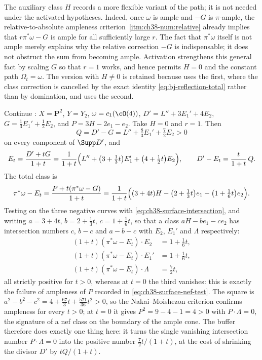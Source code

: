 \begin{remark}
\label{rem:ch38-buffer-H}
The auxiliary class $H$ records a more flexible variant of the path; it
is not needed under the activated hypotheses.  Indeed, once $\omega$ is
ample and $-G$ is $\pi$-ample, the relative-to-absolute ampleness
criterion
\,\cref{itm:ch38-num:relative} already
implies that $r\pi^*\omega-G$ is ample for all sufficiently large
$r$.  The fact that $\pi^*\omega$ itself is not ample merely explains
why the relative correction $-G$ is indispensable; it does not obstruct
the sum from becoming ample.  Activation strengthens this general fact by
scaling $G$ so that $r=1$ works, and hence permits $H=0$ and the
constant path $\Omega_t=\omega$.  The version with $H\neq0$ is retained
because
 uses the first, where the class correction is
cancelled by the exact identity \eqref{eq:bj-reflection-total} rather than
by domination, and  uses the second.
\end{remark}

\begin{example}
\label{ex:ch38-buffer-surface}
Continue : $X=\mathbf P^2$,
$Y=Y_2$, $\omega=c_1(\cO(4))$,
$D'=L''+3E_1'+4E_2$, $G=\tfrac13E_1'+\tfrac12E_2$, and
$P=3H-2e_1-e_2$.  Take $H=0$ and $r=1$.  Then
\[
 Q=D'-G=L''+\tfrac83E_1'+\tfrac72E_2>0
\]
on every component of $\Supp D'$, and
\[
 E_t=\frac{D'+tG}{1+t}
 =\frac{1}{1+t}\Bigl(L''+\bigl(3+\tfrac13t\bigr)E_1'
 +\bigl(4+\tfrac12t\bigr)E_2\Bigr),
 \qquad
 D'-E_t=\frac{t}{1+t}\,Q .
\]
The total class is
\[
 \pi^*\omega-E_t=\frac{P+t(\pi^*\omega-G)}{1+t}
 =\frac{1}{1+t}\Bigl(
   (3+4t)H-\bigl(2+\tfrac13t\bigr)e_1-\bigl(1+\tfrac16t\bigr)e_2\Bigr).
\]
Testing on the three negative curves with
\eqref{eq:ch38-surface-intersection}, and writing
$a=3+4t$, $b=2+\tfrac13t$, $c=1+\tfrac16t$, so that a class
$aH-be_1-ce_2$ has intersection numbers $c$, $b-c$ and $a-b-c$
with $E_2$, $E_1'$ and $\Lambda$ respectively:
\[
 \begin{aligned}
  (1+t)(\pi^*\omega-E_t)\cdot E_2&=1+\tfrac16t,\\
  (1+t)(\pi^*\omega-E_t)\cdot E_1'&=1+\tfrac16t,\\
  (1+t)(\pi^*\omega-E_t)\cdot\Lambda&=\tfrac72t,
 \end{aligned}
\]
all strictly positive for $t>0$, whereas at $t=0$ the third vanishes:
this is exactly the failure of ampleness of $P$ recorded in
\eqref{eq:ch38-surface-nef-test}.  The square is
$a^2-b^2-c^2=4+\tfrac{67}3t+\tfrac{571}{36}t^2>0$, so the
Nakai--Moishezon criterion confirms ampleness for every $t>0$; at
$t=0$ it gives $P^2=9-4-1=4>0$ with $P\cdot\Lambda=0$, the
signature of a nef class on the boundary of the ample cone.  The buffer
therefore does exactly one thing here: it turns the single vanishing
intersection number $P\cdot\Lambda=0$ into the positive number
$\tfrac72t/(1+t)$, at the cost of shrinking the divisor $D'$ by
$tQ/(1+t)$.
\end{example}


